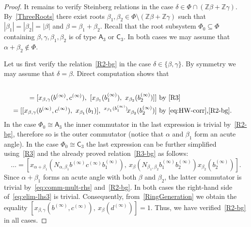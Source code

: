 \documentclass[oneside, 11pt]{amsart}
\numberwithin{equation}{section}
\theoremstyle{definition}
\theoremstyle{remark}
\newcommand{\ZZ}{\mathbb{Z}}
\newcommand{\up}[2]{{^{#1}\!{#2}}}
\newcommand{\rA}{\mathsf{A}}
\newcommand{\rC}{\mathsf{C}}
\begin{document}
\begin{proof}
 It remains to verify Steinberg relations in the case \(\delta \in \Phi \cap (\ZZ \beta + \ZZ \gamma)\).
 By~\cref{ThreeRoots} there exist roots \(\beta_1, \beta_2 \in \Phi \setminus (\ZZ \beta + \ZZ \gamma)\) such that \(|\beta_1| = |\beta_2| = |\beta|\) and \(\beta = \beta_1 + \beta_2\). 
 Recall that the root subsystem $\Phi_0 \subseteq \Phi$ containing $\beta,\gamma,\beta_1,\beta_2$ is of type $\rA_3$ or $\rC_3$. 
 In both cases we may assume that $\alpha + \beta_2 \not\in\Phi$.
 
 Let us first verify the relation~\eqref{R2-bg} in the case $\delta \in \{\beta, \gamma\}$. By symmetry we may assume that $\delta = \beta$. 
 Direct computation shows that
 \begin{align}
  [x_{\beta,\gamma}(b^{(\infty)}, c^{(\infty)}),\ x_\beta(N_{\beta_1, \beta_2} b_1^{(\infty)}b_2^{(\infty)})] \nonumber \\
   = [x_{\beta,\gamma}(b^{(\infty)}, c^{(\infty)}),\ [x_{\beta_1}(b_1^{(\infty)}),\ x_{\beta_2}(b_2^{(\infty)})]]  & \text{ by~\eqref{R3}} \label{eq:elim-lhs3} \\ 
   = [[x_{\beta, \gamma}(b^{(\infty)}, c^{(\infty)}),\ x_{\beta_1}(b_1)],\ \up{x_{\beta_1}(b_1^{(\infty)})} x_{\beta_2}(b_2^{(\infty)})]  & \text{ by~\eqref{eq:HW-corr},\eqref{R2-bg}.} \nonumber \end{align}
In the case $\Phi_0\cong \rA_3$ the inner commutator in the last expression is trivial by~\eqref{R2-bg},
 therefore so is the outer commutator (notice that $\alpha$ and $\beta_1$ form an acute angle).
In the case $\Phi_0\cong \rC_3$ the last expression can be further simplified using~\eqref{R3} and the already proved relation~\eqref{R3-bg} as follows:
\[ \ldots = [x_{\alpha+\beta_1}(N_{\alpha, \beta_1} b^{(\infty)}c^{(\infty)}b_1^{(\infty)}),\ x_{\beta}(N_{\beta_1, \beta_2} b_1^{(\infty)} b_2^{(\infty)}) x_{\beta_2}(b_2^{(\infty)})]. \]
Since $\alpha+\beta_1$ forms an acute angle with both $\beta$ and $\beta_2$, the latter commutator is trivial by~\eqref{eq:comm-mult-rhs} and~\eqref{R2-bg}.  
  In both cases the right-hand side of~\eqref{eq:elim-lhs3} is trivial. Consequently, from~\cref{RingGeneration} we obtain the equality
 $[x_{\beta,\gamma}(b^{(\infty)}, c^{(\infty)}),\ x_\beta(d^{(\infty)})] = 1.$
 Thus, we have verified~\eqref{R2-bg} in all cases. 
 

\end{proof}
\end{document}
